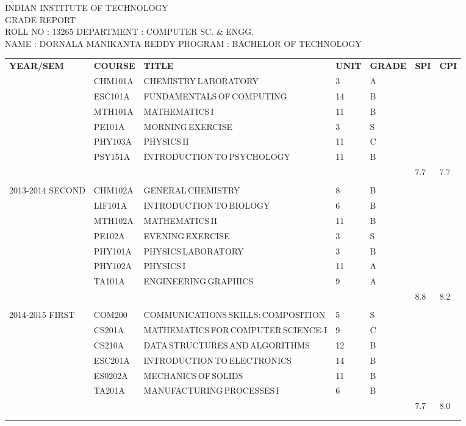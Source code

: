 \documentclass{article}
\newcommand{\transcriptentry}[6]{
		\tiny{#1} & \tiny{#2} & \tiny{#3} & \tiny{#4} & \tiny{#5} & \tiny{#6} \\ 
		}
\begin{document}

\begin{center}
	\tiny{INDIAN INSTITUTE OF TECHNOLOGY}\\
	\tiny{GRADE REPORT}\\
	\tiny{ROLL NO : 13265} \hfill \tiny{DEPARTMENT : COMPUTER SC. \& ENGG.}\\
	\tiny{NAME : DORNALA MANIKANTA REDDY} \hfill \tiny{PROGRAM : BACHELOR OF TECHNOLOGY}\\
\end{center}
\begin{center}
	\begin{tabular}{m{5em}  m{1.5cm} m{5cm} m{0.5cm} m{0.7cm} m{0.3cm} m{0.5cm}} 
	\hdashline
	\tiny{\textbf{YEAR/SEM}} & \transcriptentry{\textbf{COURSE}}{\textbf{TITLE}}{\textbf{UNIT}}{\textbf{GRADE}}{\textbf{SPI}}{\textbf{CPI}}
	\hdashline
	\multirow{7}{5em}{\tiny{2013-2014 FIRST}}
		& \transcriptentry{CHM101A}{CHEMISTRY\,LABORATORY}{3}{A}{}{}
		& \transcriptentry{ESC101A}{FUNDAMENTALS\,OF\,COMPUTING}{14}{B}{}{}
		& \transcriptentry{MTH101A}{MATHEMATICS\,I}{11}{B}{}{}
		& \transcriptentry{PE101A}{MORNING\,EXERCISE}{3}{S}{}{}
		& \transcriptentry{PHY103A}{PHYSICS\,II}{11}{C}{}{}
		& \transcriptentry{PSY151A}{INTRODUCTION\,TO\,PSYCHOLOGY}{11}{B}{}{}
		& \transcriptentry{}{}{}{}{7.7}{7.7}
		\\
	\multirow{7}{5em}{\tiny{2013-2014 SECOND}}
		& \transcriptentry{CHM102A}{GENERAL\,CHEMISTRY}{8}{B}{}{}
		& \transcriptentry{LIF101A}{INTRODUCTION\,TO\,BIOLOGY}{6}{B}{}{}
		& \transcriptentry{MTH102A}{MATHEMATICS\,II}{11}{B}{}{}
		& \transcriptentry{PE102A}{EVENING\,EXERCISE}{3}{S}{}{}
		& \transcriptentry{PHY101A}{PHYSICS\,LABORATORY}{3}{B}{}{}
		& \transcriptentry{PHY102A}{PHYSICS\,I}{11}{A}{}{}
		& \transcriptentry{TA101A}{ENGINEERING\,GRAPHICS}{9}{A}{}{}
		& \transcriptentry{}{}{}{}{8.8}{8.2}
		\\	
	\multirow{7}{5em}{\tiny{2014-2015 FIRST}}
		& \transcriptentry{COM200}{COMMUNICATIONS\,SKILLS:\,COMPOSITION}{5}{S}{}{}
		& \transcriptentry{CS201A}{MATHEMATICS\,FOR\,COMPUTER\,SCIENCE-I}{9}{C}{}{}
		& \transcriptentry{CS210A}{DATA\,STRUCTURES\,AND\,ALGORITHMS}{12}{B}{}{}
		& \transcriptentry{ESC201A}{INTRODUCTION\,TO\,ELECTRONICS}{14}{B}{}{}
		& \transcriptentry{ES0202A}{MECHANICS\,OF\,SOLIDS}{11}{B}{}{}
		& \transcriptentry{TA201A}{MANUFACTURING\,PROCESSES\,I}{6}{B}{}{}
		& \transcriptentry{}{}{}{}{7.7}{8.0}\\
	\hdashline
	\end{tabular}
\end{center}
\end{document}
